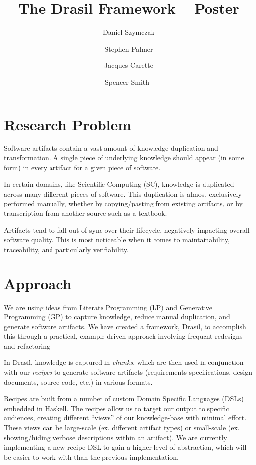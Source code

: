 \documentclass[twocolumn, 10pt]{article} %
\title{The Drasil Framework -- Poster}
\author{
  Daniel Szymczak
  \and
  Stephen Palmer
  \and
  Jacques Carette
  \and
  Spencer Smith\
}
\begin{document}
\maketitle

\section{Research Problem}

Software artifacts contain a vast amount of knowledge duplication and
transformation. A single piece of underlying knowledge should appear (in some
form) in every artifact for a given piece of software.

In certain domains,
like Scientific Computing (SC),
knowledge is duplicated across many different pieces of software. This
duplication is almost exclusively performed manually, whether by copying/pasting
from existing artifacts, or by transcription from another source such as a textbook.

Artifacts tend to fall out of sync over their lifecycle,
negatively impacting overall software quality. This is most noticeable 
when it comes to maintainability, traceability, and particularly verifiability.

\section{Approach}

We are using ideas from Literate Programming (LP) and Generative Programming
(GP) to capture knowledge, reduce manual duplication, and generate software
artifacts. We have created a framework, Drasil, to accomplish this through a
practical, example-driven approach involving frequent redesigns and refactoring.

In Drasil, knowledge is captured in \textit{chunks}, which are then used in
conjunction with our \textit{recipes} to generate software artifacts (requirements
specifications, design documents, source code, etc.) in various formats.

Recipes are built from a number of custom Domain Specific Languages (DSLs)
embedded in Haskell. The recipes allow us to target our output to specific
audiences, creating different ``views'' of our knowledge-base with minimal
effort. These views can be large-scale (ex. different artifact types) or
small-scale (ex. showing/hiding verbose descriptions within an artifact). We are
currently implementing a new recipe DSL to gain a higher level of abstraction,
which will be easier to work with than the previous implementation.
\end{document}
